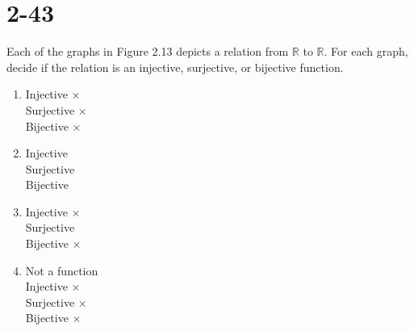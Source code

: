 \documentclass{article}
\newcommand{\R}{\mathbb{R}}
\begin{document}
\section{2-43}

Each of the graphs in Figure 2.13 depicts a relation from $\R$ to $\R$.  For
each graph, decide if the relation is an injective, surjective, or bijective
function.

\begin{enumerate}[1)]
    \item Injective $\times$ \\
          Surjective $\times$ \\
          Bijective $\times$ \\

    \item Injective \checkmark \\
          Surjective \checkmark \\
          Bijective \checkmark \\

    \item Injective $\times$ \\
          Surjective \checkmark \\
          Bijective $\times$ \\

    \item Not a function \\
          Injective $\times$ \\
          Surjective $\times$ \\
          Bijective $\times$ \\
\end{enumerate}
\end{document}
